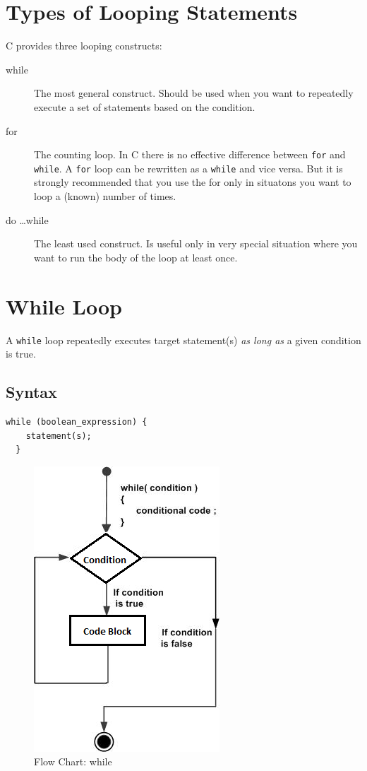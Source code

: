 \documentclass[11pt,a4paper]{article}
\begin{document}
\section*{Types of Looping Statements}
C provides three looping constructs:
\begin{description}
\item[while] The most general construct. Should be used when you want to repeatedly execute a set of statements based on the condition. 
\item[for] The counting loop. In C there is no effective difference between \lstinline!for! and \lstinline!while!.  A \lstinline!for! loop can be rewritten as a \lstinline!while! and vice versa. But it is strongly recommended that you use the for only in situatons you want to loop a (known) number of times.
\item[do \ldots while] The least used construct. Is useful only in very special situation where you want to run the body of the loop at least once.
\end{description}

\section*{While Loop}
A \lstinline!while! loop repeatedly executes target statement(s) \emph{as long as} a given condition is true.

\subsection*{Syntax}
\begin{lstlisting}[numbers=none]
  while (boolean_expression) {
    statement(s);
  }
\end{lstlisting}
\begin{figure}[ht]
\begin{center}
\includegraphics[scale=0.7]{while_loop.png}
\caption{Flow Chart: while}
\label{Flowchart:while}
\end{center}
\end{figure}
\end{document}
